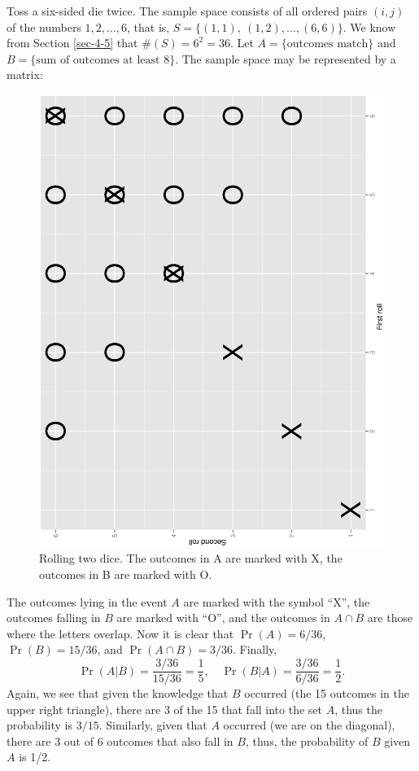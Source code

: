 \documentclass[captions=tableheading]{scrbook}
\begin{document}
\begin{example}
Toss a six-sided die twice. The sample space consists of all ordered pairs \((i,j)\) of the numbers \(1,2,\ldots,6\), that is, \( S = \{ (1,1),\ (1,2),\ldots,(6,6) \} \). We know from Section \ref{sec-4-5} that \( \# (S) = 6^{2} = 36 \). Let \( A = \{ \mbox{outcomes match} \} \) and \( B = \{ \mbox{sum of outcomes at least 8} \} \). The sample space may be represented by a matrix:








\begin{figure}[th]
  \includegraphics[angle=270, totalheight=4in]{ps/prob/twodiceAB.ps}
  \caption[Rolling two dice]{\small Rolling two dice. The outcomes in A are marked with X, the outcomes in B are marked with O.}
  \label{fig-twodiceAB}
\end{figure}


The outcomes lying in the event \(A\) are marked with the symbol ``X'', the outcomes falling in \(B\) are marked with ``O'', and the outcomes in \(A\cap B\) are those where the letters overlap. Now it is clear that \(\Pr(A)=6/36\), \(\Pr(B)=15/36\), and \(\Pr(A\cap B)=3/36\).  Finally, 
\[
\Pr(A|B)=\frac{3/36}{15/36}=\frac{1}{5},\quad\Pr(B|A)=\frac{3/36}{6/36}=\frac{1}{2}.
\]
Again, we see that given the knowledge that \(B\) occurred (the 15 outcomes in the upper right triangle), there are 3 of the 15 that fall into the set \(A\), thus the probability is \(3/15\). Similarly, given that \(A\) occurred (we are on the diagonal), there are 3 out of 6 outcomes that also fall in \(B\), thus, the probability of \(B\) given \(A\) is 1/2. 
\end{example}
\end{document}

